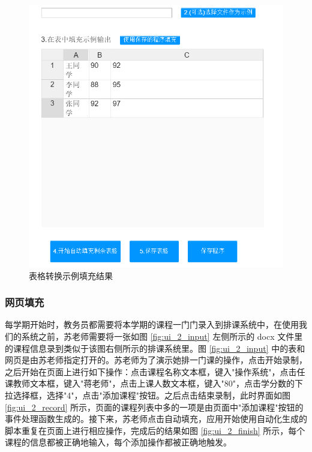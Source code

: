 \documentclass[design, pageheader]{njubachelor}
\begin{document}
\begin{figure}[!htbp]
    \centering
    \includegraphics[width=15cm,keepaspectratio]{figures/ui_1_finish.png}
    \caption{表格转换示例填充结果}
    \label{fig:ui_1_finish}
\end{figure}

\subsubsection{网页填充}

每学期开始时，教务员都需要将本学期的课程一门门录入到排课系统中，在使用我们的系统之前，苏老师需要将一张如图 \ref{fig:ui_2_input} 左侧所示的 docx 文件里的课程信息录到类似于该图右侧所示的排课系统里。图 \ref{fig:ui_2_input} 中的表和网页是由苏老师指定打开的。苏老师为了演示她排一门课的操作，点击开始录制，之后开始在页面上进行如下操作：点击课程名称文本框，键入"操作系统"，点击任课教师文本框，键入"蒋老师"，点击上课人数文本框，键入"80"，点击学分数的下拉选择框，选择"4"，点击"添加课程"按钮。之后点击结束录制，此时界面如图 \ref{fig:ui_2_record} 所示，页面的课程列表中多的一项是由页面中"添加课程"按钮的事件处理函数生成的。接下来，苏老师点击自动填充，应用开始使用自动化生成的脚本重复在页面上进行相应操作，完成后的结果如图 \ref{fig:ui_2_finish} 所示，每个课程的信息都被正确地输入，每个添加操作都被正确地触发。
\end{document}

